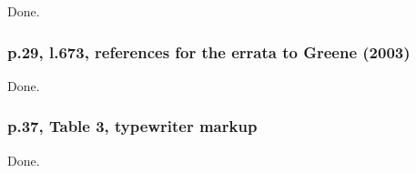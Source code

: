\documentclass[12pt,english]{scrartcl}
\begin{document}
Done.

\subsubsection{p.29, l.673, references for the errata to Greene (2003)}

Done.

\subsubsection{p.37, Table 3, typewriter markup}

Done.
\end{document}
